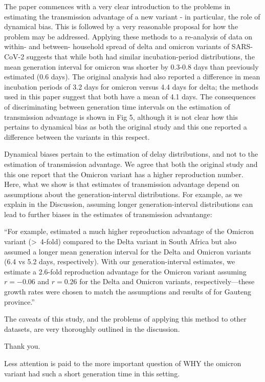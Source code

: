 \documentclass[12pt]{article}
\newcommand{\revtext}{\textsf}
\begin{document}
\revtext{The paper commences with a very clear introduction to the problems in estimating the transmission advantage of a new variant - in particular, the role of dynamical bias. This is followed by a very reasonable proposal for how the problem may be addressed. Applying these methods to a re-analysis of data on within- and between- household spread of delta and omicron variants of SARS-CoV-2 suggests that while both had similar incubation-period distributions, the mean generation interval for omicron was shorter by 0.3-0.8 days than previously estimated (0.6 days). The original analysis had also reported a difference in mean incubation periods of 3.2 days for omicron versus 4.4 days for delta; the methods used in this paper suggest that both have a mean of 4.1 days. The consequences of discriminating between generation time intervals on the estimation of transmission advantage is shown in Fig 5, although it is not clear how this pertains to dynamical bias as both the original study and this one reported a difference between the variants in this respect.}

Dynamical biases pertain to the estimation of delay distributions, and not to the estimation of transmission advantage. 
We agree that both the original study and this one report that the Omicron variant has a higher reproduction number. 
Here, what we show is that estimates of transmission advantage depend on assumptions about the generation-interval distributions. 
For example, as we explain in the Discussion, assuming longer generation-interval distributions can lead to further biases in the estimates of transmission advantange:

``For example, \cite{pearson2021bounding} estimated a much higher reproduction advantage of the Omicron variant (\textgreater\ 4-fold) compared to the Delta variant in South Africa but also assumed a longer mean generation interval for the Delta and Omicron variants (6.4 vs 5.2 days, respectively).
With our generation-interval estimates, we estimate a 2.6-fold reproduction advantage for the Omicron variant assuming $r=-0.06$ and $r=0.26$ for the Delta and Omicron variants, respectively---these growth rates were chosen to match the assumptions and results of \cite{pearson2021bounding} for Gauteng province.''

\revtext{The caveats of this study, and the problems of applying this method to other datasets, are very thoroughly outlined in the discussion.} 

Thank you.

\revtext{Less attention is paid to the more important question of WHY the omicron variant had such a short generation time in this setting.}
\end{document}
